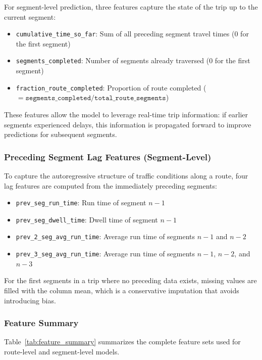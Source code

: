 For segment-level prediction, three features capture the state of the trip up to the current segment:
\begin{itemize}
    \item \texttt{cumulative\_time\_so\_far}: Sum of all preceding segment travel times (0 for the first segment)
    \item \texttt{segments\_completed}: Number of segments already traversed (0 for the first segment)
    \item \texttt{fraction\_route\_completed}: Proportion of route completed ($= \texttt{segments\_completed} / \texttt{total\_route\_segments}$)
\end{itemize}

These features allow the model to leverage real-time trip information: if earlier segments experienced delays, this information is propagated forward to improve predictions for subsequent segments.

\subsubsection{Preceding Segment Lag Features (Segment-Level)}
\label{subsubsec:lag_features}

To capture the autoregressive structure of traffic conditions along a route, four lag features are computed from the immediately preceding segments:
\begin{itemize}
    \item \texttt{prev\_seg\_run\_time}: Run time of segment $n-1$
    \item \texttt{prev\_seg\_dwell\_time}: Dwell time of segment $n-1$
    \item \texttt{prev\_2\_seg\_avg\_run\_time}: Average run time of segments $n-1$ and $n-2$
    \item \texttt{prev\_3\_seg\_avg\_run\_time}: Average run time of segments $n-1$, $n-2$, and $n-3$
\end{itemize}

For the first segments in a trip where no preceding data exists, missing values are filled with the column mean, which is a conservative imputation that avoids introducing bias.

\subsubsection{Feature Summary}
\label{subsubsec:feature_summary}

Table~\ref{tab:feature_summary} summarizes the complete feature sets used for route-level and segment-level models.

